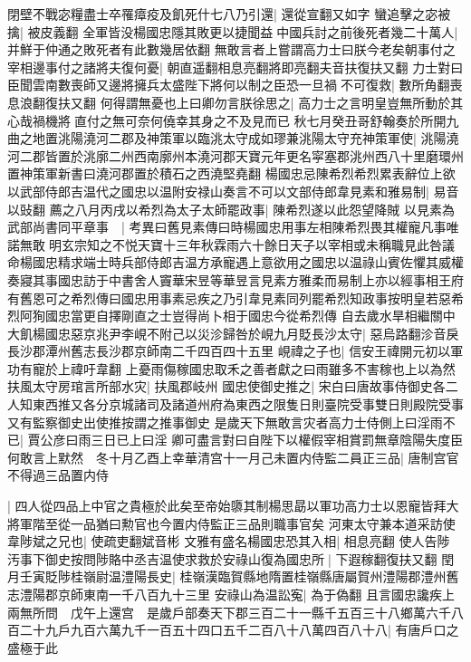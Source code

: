 閉壁不戰宓糧盡士卒罹瘴疫及飢死什七八乃引還|{
	還從宣翻又如字}
蠻追擊之宓被擒|{
	被皮義翻}
全軍皆没楊國忠隱其敗更以捷聞益中國兵討之前後死者幾二十萬人|{
	并鮮于仲通之敗死者有此數幾居依翻}
無敢言者上嘗謂高力士曰朕今老矣朝事付之宰相邊事付之諸將夫復何憂|{
	朝直遥翻相息亮翻將即亮翻夫音扶復扶又翻}
力士對曰臣聞雲南數喪師又邊將擁兵太盛陛下將何以制之臣恐一旦禍不可復救|{
	數所角翻喪息浪翻復扶又翻}
何得謂無憂也上曰卿勿言朕徐思之|{
	高力士之言明皇豈無所動於其心哉禍機將直付之無可奈何僥幸其身之不及見而已}
秋七月癸丑哥舒翰奏於所開九曲之地置洮陽澆河二郡及神策軍以臨洮太守成如璆兼洮陽太守充神策軍使|{
	洮陽澆河二郡皆置於洮廓二州西南廓州本澆河郡天寶元年更名寜塞郡洮州西八十里磨環州置神策軍新書曰澆河郡置於積石之西澆堅堯翻}
楊國忠忌陳希烈希烈累表辭位上欲以武部侍郎吉温代之國忠以温附安禄山奏言不可以文部侍郎韋見素和雅易制|{
	易音以䜴翻}
薦之八月丙戌以希烈為太子太師罷政事|{
	陳希烈遂以此怨望降賊}
以見素為武部尚書同平章事　|{
	考異曰舊見素傳曰時楊國忠用事左相陳希烈畏其權寵凡事唯諾無敢明玄宗知之不悦天寶十三年秋霖雨六十餘日天子以宰相或未稱職見此咎議命楊國忠精求端士時兵部侍郎吉温方承寵遇上意欲用之國忠以温祿山賓佐懼其威權奏寢其事國忠訪于中書舍人竇華宋昱等華昱言見素方雅柔而易制上亦以經事相王府有舊恩可之希烈傳曰國忠用事素忌疾之乃引韋見素同列罷希烈知政事按明皇若惡希烈阿狥國忠當更自擇剛直之士豈得尚卜相于國忠今從希烈傳}
自去歲水旱相繼關中大飢楊國忠惡京兆尹李峴不附己以災沴歸咎於峴九月貶長沙太守|{
	惡烏路翻沴音戾長沙郡潭州舊志長沙郡京師南二千四百四十五里}
峴禕之子也|{
	信安王禕開元初以軍功有寵於上禕吁韋翻}
上憂雨傷稼國忠取禾之善者獻之曰雨雖多不害稼也上以為然扶風太守房琯言所部水灾|{
	扶風郡岐州}
國忠使御史推之|{
	宋白曰唐故事侍御史各二人知東西推又各分京城諸司及諸道州府為東西之限隻日則臺院受事雙日則殿院受事又有監察御史出使推按謂之推事御史}
是歲天下無敢言灾者高力士侍側上曰淫雨不已|{
	賈公彦曰雨三日已上曰淫}
卿可盡言對曰自陛下以權假宰相賞罰無章陰陽失度臣何敢言上默然　冬十月乙酉上幸華清宫十一月己未置内侍監二員正三品|{
	唐制宫官不得過三品置内侍}


|{
	四人從四品上中官之貴極於此矣至帝始隳其制楊思勗以軍功高力士以恩寵皆拜大將軍階至從一品猶曰勲官也今置内侍監正三品則職事官矣}
河東太守兼本道采訪使韋陟斌之兄也|{
	使疏吏翻斌音彬}
文雅有盛名楊國忠恐其入相|{
	相息亮翻}
使人告陟汚事下御史按問陟賂中丞吉温使求救於安祿山復為國忠所|{
	下遐稼翻復扶又翻}
閏月壬寅貶陟桂嶺尉温澧陽長史|{
	桂嶺漢臨賀縣地隋置桂嶺縣唐屬賀州澧陽郡澧州舊志澧陽郡京師東南一千八百九十三里}
安祿山為温訟寃|{
	為于偽翻}
且言國忠讒疾上兩無所問　戊午上還宫　是歲戶部奏天下郡三百二十一縣千五百三十八鄉萬六千八百二十九戶九百六萬九千一百五十四口五千二百八十八萬四百八十八|{
	有唐戶口之盛極于此}


